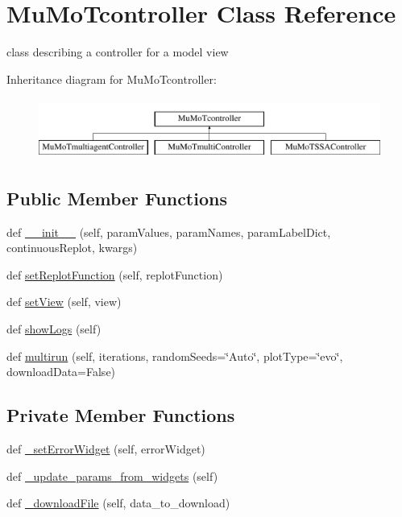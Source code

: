 \hypertarget{class_mu_mo_t_1_1_mu_mo_tcontroller}{}\section{Mu\+Mo\+Tcontroller Class Reference}
\label{class_mu_mo_t_1_1_mu_mo_tcontroller}


class describing a controller for a model view  


Inheritance diagram for Mu\+Mo\+Tcontroller\+:\begin{figure}[H]
\begin{center}
\leavevmode
\includegraphics[height=2.000000cm]{class_mu_mo_t_1_1_mu_mo_tcontroller}
\end{center}
\end{figure}
\subsection*{Public Member Functions}
\begin{DoxyCompactItemize}
\item 
def \hyperlink{class_mu_mo_t_1_1_mu_mo_tcontroller_a833cd489e067743a190b434eea451095}{\+\_\+\+\_\+init\+\_\+\+\_\+} (self, param\+Values, param\+Names, param\+Label\+Dict, continuous\+Replot, kwargs)
\item 
def \hyperlink{class_mu_mo_t_1_1_mu_mo_tcontroller_aafc1e69cab41071217fe6676a8089249}{set\+Replot\+Function} (self, replot\+Function)
\item 
def \hyperlink{class_mu_mo_t_1_1_mu_mo_tcontroller_a40e22e664ecb6e379377ee1cea60073c}{set\+View} (self, view)
\item 
def \hyperlink{class_mu_mo_t_1_1_mu_mo_tcontroller_aca4d648d909f4722c7e07197675500bb}{show\+Logs} (self)
\item 
def \hyperlink{class_mu_mo_t_1_1_mu_mo_tcontroller_aa74bfc216071ff6b768c7a584917bfc6}{multirun} (self, iterations, random\+Seeds=\char`\"{}Auto\char`\"{}, plot\+Type=\char`\"{}evo\char`\"{}, download\+Data=False)
\end{DoxyCompactItemize}
\subsection*{Private Member Functions}
\begin{DoxyCompactItemize}
\item 
def \hyperlink{class_mu_mo_t_1_1_mu_mo_tcontroller_aef34ced86f7a9b37af011c0536798897}{\+\_\+set\+Error\+Widget} (self, error\+Widget)
\item 
def \hyperlink{class_mu_mo_t_1_1_mu_mo_tcontroller_add4eacb8e812feeca1d4b2538e3bd6e0}{\+\_\+update\+\_\+params\+\_\+from\+\_\+widgets} (self)
\item 
def \hyperlink{class_mu_mo_t_1_1_mu_mo_tcontroller_ab703aa8fe14c83d5f12fa82d4e2c42d9}{\+\_\+download\+File} (self, data\+\_\+to\+\_\+download)
\end{DoxyCompactItemize}
